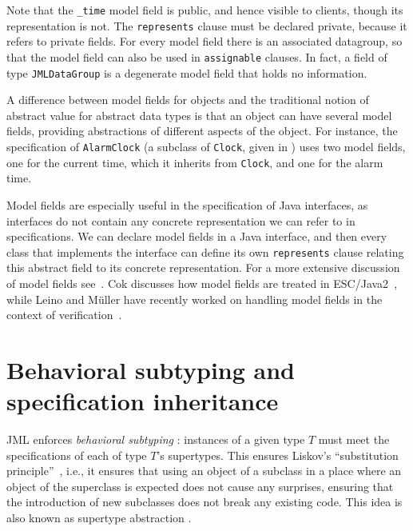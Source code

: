 \documentclass{llncs}
\begin{document}
Note that the \texttt{\_time} model field is public, and hence visible to
clients, though its representation is not.  The \texttt{represents} clause
must be declared private, because it refers to private fields.
%
For every model field there is an associated datagroup, so that the 
model field can also be used in \texttt{assignable} clauses.
In fact, a field of type \texttt{JMLDataGroup} is a degenerate model
field that holds no information.

A difference between model fields for objects and the traditional notion of
abstract value for abstract data types is that an object can have several
model fields, providing abstractions of different aspects of the object.
For instance, the specification of \texttt{AlarmClock}
(a subclass of \texttt{Clock}, given in ) uses 
two model fields, one for the current time, which it inherits from
\texttt{Clock}, and one for the alarm time.

Model fields are especially useful in the specification of Java interfaces,
as interfaces do not contain any concrete representation we can refer
to in specifications. We can declare model fields in a Java interface, and
then every class that implements 
the interface can define its own \texttt{represents} clause relating
this abstract field to its concrete representation. 
%
%
For a more extensive discussion of model fields see~\cite{Cheon-etal05}.
Cok discusses how model fields are treated in ESC/Java2~\cite{Cok05}, while
Leino and M\"{u}ller have recently worked on handling model fields in the
context of verification~\cite{LeinoMuller06}.

\section{Behavioral subtyping and specification inheritance}
\label{Sec:behsubtyping}

JML enforces \emph{behavioral subtyping}
\cite{America90,Dhara-Leavens96,Leavens-Dhara00,Leavens-Weihl95,LiskovWing94,Meyer97}:
instances of a given type $T$ must meet the specifications of each of
type $T$'s supertypes.
This ensures Liskov's ``substitution principle''~\cite{Liskov88},
i.e., it ensures that using an object of a subclass in a place where an object of 
the superclass is expected does not cause any surprises, ensuring that 
the introduction of new subclasses does not break any existing code.
This idea is also known as supertype abstraction
\cite{Leavens90,Leavens-Weihl95}.
\end{document}
